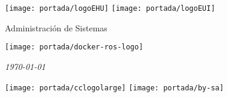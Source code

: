 \begin{titlepage}
	\texttt{[image: portada/logoEHU]}
	\hspace{\fill}
	\texttt{[image: portada/logoEUI]}
	\vspace{1.5cm}
	\begin{center}
		
		\LARGE{Administración de Sistemas}
		
		\vskip1.5cm
		
		\Huge{\textbf{\thetitle}}
		
		\vskip1.5cm
		
		\texttt{[image: portada/docker-ros-logo]}
		
		\vskip1.5cm
		
		\Large{\theauthor}
	
		\vskip 1cm
		
		\textit{\today}
	\end{center}
	\vspace{2cm}
	\hspace{\fill}
	\texttt{[image: portada/cclogolarge]}
	\hspace{1cm}
	\texttt{[image: portada/by-sa]}
	\hspace{\fill}
\end{titlepage}